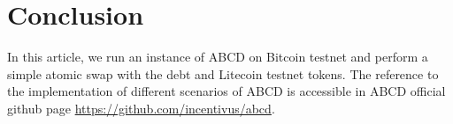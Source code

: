 \documentclass[conference,compsoc]{IEEEtran}
\begin{document}
%





\section{Conclusion}

In this article, we run an instance of ABCD on Bitcoin testnet and perform a simple atomic swap with the debt and Litecoin testnet tokens. The reference to the implementation of different scenarios of ABCD is accessible in ABCD official github page \href{https://github.com/incentivus/abcd}{https://github.com/incentivus/abcd}.


\end{document}
